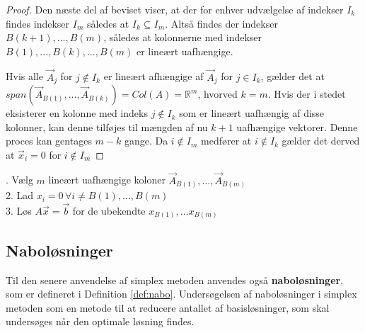 \begin{proof}
Den næste del af beviset viser, at der for enhver udvælgelse af indekser $I_k$ findes indekser $I_m$ således at $I_k \subseteq I_m$. 
Altså findes der indekser $B(k+1),...,B(m)$, således at kolonnerne med indekser $B(1),...,B(k),...,B(m)$ er lineært uafhængige. 

Hvis alle $\vec{A}_j$ for $j \notin I_k$ er lineært afhængige af $\vec{A}_j$ for $j \in I_k$, gælder det at $span\left( \vec{A}_{B(1)},...,\vec{A}_{B(k)} \right)=Col(A)=\mathds{R}^m$, hvorved $k=m$. 
Hvis der i stedet eksisterer en kolonne med indeks $j \notin I_k$ som er lineært uafhængig af disse kolonner, kan denne tilføjes til mængden af nu $k+1$ uafhængige vektorer. Denne proces kan gentages $m-k$ gange. Da $i \notin I_m$ medfører at $i \notin I_k$ gælder det derved at $\vec{x}_i =0$ for $i \notin I_m$
\end{proof}

\begin{pro}
. Vælg $m$ lineært uafhængige koloner $\vec{A}_{B(1)},\dots,\vec{A}_{B(m)}$\\
2. Lad $x_i=0 \,\forall i\neq B(1),\dots,B(m)$\\
3. Løs $A\vec{x}=\vec{b}$ for de ubekendte $x_{B(1)},\dots x_{B(m)}$
\end{pro}

\begin{comment}
Der mangler bare generelt bindetekst mellem sætninger, fra at korollar 6.12 skal introduceres til at kapitlet skal afsluttes og føres videre til naboløsninger
\end{comment}

\subsection{Naboløsninger}

Til den senere anvendelse af simplex metoden anvendes også \textbf{naboløsninger}, som er defineret i Definition \ref{def:nabo}. Undersøgelsen af naboløsninger i simplex metoden som en metode til at reducere antallet af basisløsninger, som skal undersøges når den optimale løsning findes. %

